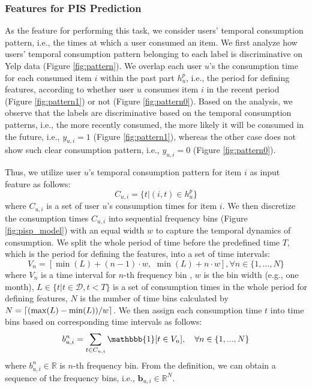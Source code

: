 \documentclass[sigconf]{acmart}
\DeclarePairedDelimiter\ceil{\lceil}{\rceil}
\begin{document}
\subsubsection{\textbf{Features for PIS Prediction}}
As the feature for performing this task, we consider users' temporal consumption pattern, i.e., the times at which a user consumed an item.
We first analyze how users' temporal consumption pattern belonging to each label is discriminative on Yelp data (Figure \ref{fig:pattern}). We overlap each user $u$'s the consumption time for each consumed item $i$ within the past part $h_u^p$, i.e., the period for defining features, according to whether user $u$ consumes item $i$ in the recent period (Figure \ref{fig:pattern1}) or not (Figure \ref{fig:pattern0}). 
Based on the analysis, we observe that the labels are discriminative based on the temporal consumption patterns, i.e., the more recently consumed, the more likely it will be consumed in the future, i.e., $y_{u,i}=1$ (Figure \ref{fig:pattern1}), whereas the other case does not show such clear consumption pattern, i.e., $y_{u,i}=0$ (Figure \ref{fig:pattern0}). 


Thus, we utilize user $u$'s temporal consumption pattern for item $i$ as input feature as follows:
\begin{equation*}
C_{u,i}=\{t| (i,t) \in h_u^p\}
\end{equation*}
where $C_{u,i}$ is a set of user $u$'s consumption times for item $i$.
We then discretize the consumption times $C_{u,i}$ into sequential frequency bins (Figure \ref{fig:pisp_model}) with an equal width $w$ to capture the temporal dynamics of consumption. We split the whole period of time before the predefined time $T$, which is the period for defining the features, into a set of time intervals:
\begin{equation*}
    V_n=[\min(L) + (n-1)\cdot w, \,\, \min(L) + n \cdot w], \forall n \in\{1,...,N\}
\end{equation*}
where $V_n$ is a time interval for $n$-th frequency bin , $w$ is the bin width (e.g., one month), $L \in \{t|t\in \mathcal{D}, t < T\}$ is a set of consumption times in the whole period for defining features, $N$ is the number of time bins calculated by $N = \ceil{(\max(L) - \min(L))/w}$.
We then assign each consumption time $t$ into time bins based on corresponding time intervals as follows:
\begin{equation}
    b_{u,i}^n = \sum_{t\in C_{u,i}} \mathbbb{1}[t \in V_n], \quad \forall n \in \{1,...,N\}
    \label{eqn:bin_assign}
\end{equation}
where $b_{u,i}^n \in \mathbb{R}$ is $n$-th frequency bin. From the definition, we can obtain a sequence of the frequency bins, i.e., $\textbf{b}_{u,i} \in \mathbb{R}^N$. 
\end{document}
